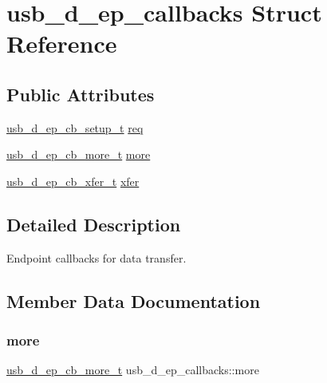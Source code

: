 \hypertarget{structusb__d__ep__callbacks}{}\section{usb\+\_\+d\+\_\+ep\+\_\+callbacks Struct Reference}
\label{structusb__d__ep__callbacks}
\subsection*{Public Attributes}
\begin{DoxyCompactItemize}
\item 
\hyperlink{group__doc__driver__hal__usb__device_ga9b29643c53a553c9b458a251bac3599a}{usb\+\_\+d\+\_\+ep\+\_\+cb\+\_\+setup\+\_\+t} \hyperlink{structusb__d__ep__callbacks_a9cd74e1e1e8789bb7777b564c6f90201}{req}
\item 
\hyperlink{group__doc__driver__hal__usb__device_gacde84eacf3bd41ee46d38bbb8569021b}{usb\+\_\+d\+\_\+ep\+\_\+cb\+\_\+more\+\_\+t} \hyperlink{structusb__d__ep__callbacks_ac904bac306caadd1432561b1a99a306f}{more}
\item 
\hyperlink{group__doc__driver__hal__usb__device_gae62eea86879f5c1995f1ca99f095e7ab}{usb\+\_\+d\+\_\+ep\+\_\+cb\+\_\+xfer\+\_\+t} \hyperlink{structusb__d__ep__callbacks_ab92a8b2dffd65936e30a1a7ab8471ec5}{xfer}
\end{DoxyCompactItemize}


\subsection{Detailed Description}
Endpoint callbacks for data transfer. 

\subsection{Member Data Documentation}
\mbox{\label{structusb__d__ep__callbacks_ac904bac306caadd1432561b1a99a306f}} 
\subsubsection{\texorpdfstring{more}{more}}
{\footnotesize\ttfamily \hyperlink{group__doc__driver__hal__usb__device_gacde84eacf3bd41ee46d38bbb8569021b}{usb\+\_\+d\+\_\+ep\+\_\+cb\+\_\+more\+\_\+t} usb\+\_\+d\+\_\+ep\+\_\+callbacks\+::more}

